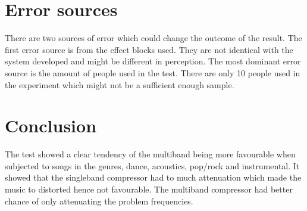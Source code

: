 
\section{Error sources}

There are two sources of error which could change the outcome of the result. The first error source is from the effect blocks used. They are not identical with the system developed and might be different in perception. The most dominant error source is the amount of people used in the test. There are only 10 people used in the experiment which might not be a sufficient enough sample.

\section{Conclusion}

The test showed a clear tendency of the multiband being more favourable when subjected to songs in the genres, dance, acoustics, pop/rock and instrumental. It showed that the singleband compressor had to much attenuation which made the music to distorted hence not favourable. The multiband compressor had better chance of only attenuating the problem frequencies.



